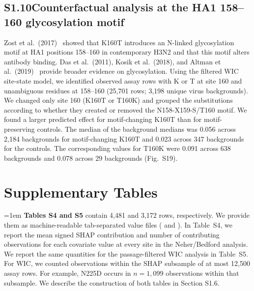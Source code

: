 \documentclass[12pt]{article}
\begin{document}
\subsection*{S1.10\quad Counterfactual analysis at the HA1 158--160 glycosylation motif}

Zost et al.\ (2017)~\cite{Zost2017PNAS} showed that K160T introduces an N-linked glycosylation motif at HA1 positions 158--160 in contemporary H3N2 and that this motif alters antibody binding. Das et al.\ (2011), Kosik et al.\ (2018), and Altman et al.\ (2019)~\cite{Das2011PNAS_glycan, Kosik2018PLoSPathog, Altman2019mBio} provide broader evidence on glycosylation. Using the filtered WIC site-state model, we identified observed assay rows with K or T at site 160 and unambiguous residues at 158--160 (25,701 rows; 3,198 unique virus backgrounds). We changed only site 160 (K160T or T160K) and grouped the substitutions according to whether they created or removed the N158-X159-S/T160 motif. We found a larger predicted effect for motif-changing K160T than for motif-preserving controls. The median of the background medians was 0.056 across 2,184 backgrounds for motif-changing K160T and 0.023 across 347 backgrounds for the controls. The corresponding values for T160K were 0.091 across 638 backgrounds and 0.078 across 29 backgrounds (Fig.~S19).

\clearpage
\section*{Supplementary Tables}







\FloatBarrier

{\emergencystretch=1em
\noindent\textbf{Tables S4 and S5} contain 4,481 and 3,172 rows, respectively. We provide them as machine-readable tab-separated value files ( and ). In Table~S4, we report the mean signed SHAP contribution and number of contributing observations for each covariate value at every site in the Neher/Bedford analysis. We report the same quantities for the passage-filtered WIC analysis in Table~S5. For WIC, we counted observations within the SHAP subsample of at most 12,500 assay rows. For example, N225D occurs in $n=1{,}099$ observations within that subsample. We describe the construction of both tables in Section S1.6.\par}
\end{document}
